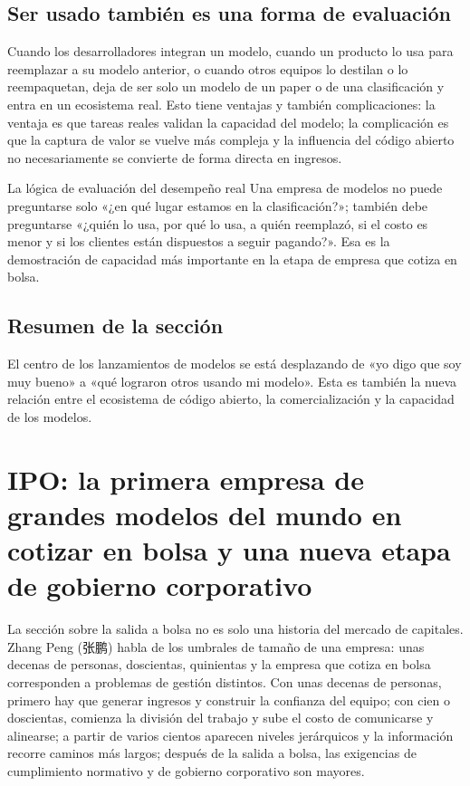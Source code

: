 \documentclass[a4paper]{article}
\begin{document}
\subsection{Ser usado también es una forma de evaluación}

Cuando los desarrolladores integran un modelo, cuando un producto lo usa para reemplazar a su modelo anterior, o cuando otros equipos lo destilan o lo reempaquetan, deja de ser solo un modelo de un paper o de una clasificación y entra en un ecosistema real. Esto tiene ventajas y también complicaciones: la ventaja es que tareas reales validan la capacidad del modelo; la complicación es que la captura de valor se vuelve más compleja y la influencia del código abierto no necesariamente se convierte de forma directa en ingresos.

\begin{importantbox}{La lógica de evaluación del desempeño real}
Una empresa de modelos no puede preguntarse solo «¿en qué lugar estamos en la clasificación?»; también debe preguntarse «¿quién lo usa, por qué lo usa, a quién reemplazó, si el costo es menor y si los clientes están dispuestos a seguir pagando?». Esa es la demostración de capacidad más importante en la etapa de empresa que cotiza en bolsa.
\end{importantbox}

\subsection{Resumen de la sección}

El centro de los lanzamientos de modelos se está desplazando de «yo digo que soy muy bueno» a «qué lograron otros usando mi modelo». Esta es también la nueva relación entre el ecosistema de código abierto, la comercialización y la capacidad de los modelos.
\section{IPO: la primera empresa de grandes modelos del mundo en cotizar en bolsa y una nueva etapa de gobierno corporativo}

La sección sobre la salida a bolsa no es solo una historia del mercado de capitales. Zhang Peng (张鹏) habla de los umbrales de tamaño de una empresa: unas decenas de personas, doscientas, quinientas y la empresa que cotiza en bolsa corresponden a problemas de gestión distintos. Con unas decenas de personas, primero hay que generar ingresos y construir la confianza del equipo; con cien o doscientas, comienza la división del trabajo y sube el costo de comunicarse y alinearse; a partir de varios cientos aparecen niveles jerárquicos y la información recorre caminos más largos; después de la salida a bolsa, las exigencias de cumplimiento normativo y de gobierno corporativo son mayores.
\end{document}

